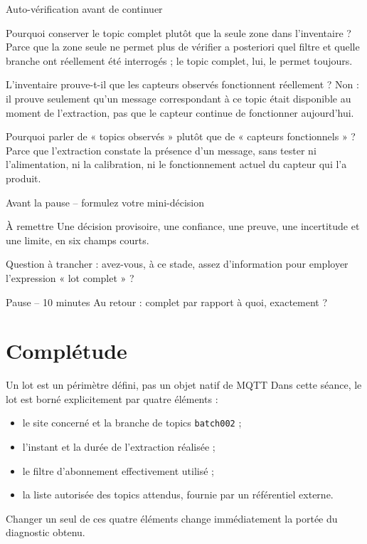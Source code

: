 \documentclass[aspectratio=169]{beamer}
\begin{document}
\begin{frame}{Auto-vérification avant de continuer}
\small
\begin{block}{Pourquoi conserver le topic complet plutôt que la seule zone dans l'inventaire ?}
Parce que la zone seule ne permet plus de vérifier a posteriori quel filtre et quelle branche ont réellement été interrogés ; le topic complet, lui, le permet toujours.
\end{block}
\begin{block}{L'inventaire prouve-t-il que les capteurs observés fonctionnent réellement ?}
Non : il prouve seulement qu'un message correspondant à ce topic était disponible au moment de l'extraction, pas que le capteur continue de fonctionner aujourd'hui.
\end{block}
\begin{block}{Pourquoi parler de « topics observés » plutôt que de « capteurs fonctionnels » ?}
Parce que l'extraction constate la présence d'un message, sans tester ni l'alimentation, ni la calibration, ni le fonctionnement actuel du capteur qui l'a produit.
\end{block}
\end{frame}

\begin{frame}{Avant la pause -- formulez votre mini-décision}
\begin{block}{À remettre}
Une décision provisoire, une confiance, une preuve, une incertitude et une limite, en six champs courts.
\end{block}
Question à trancher : avez-vous, à ce stade, assez d'information pour employer l'expression « lot complet » ?
\end{frame}

\begin{frame}{Pause -- 10 minutes}
\centering\Large Au retour : complet par rapport à quoi, exactement ?
\end{frame}

\section{Complétude}
\begin{frame}{Un lot est un périmètre défini, pas un objet natif de MQTT}
Dans cette séance, le lot est borné explicitement par quatre éléments :
\begin{itemize}
\item le site concerné et la branche de topics \texttt{batch002} ;
\item l'instant et la durée de l'extraction réalisée ;
\item le filtre d'abonnement effectivement utilisé ;
\item la liste autorisée des topics attendus, fournie par un référentiel externe.
\end{itemize}
Changer un seul de ces quatre éléments change immédiatement la portée du diagnostic obtenu.
\end{frame}
\end{document}
